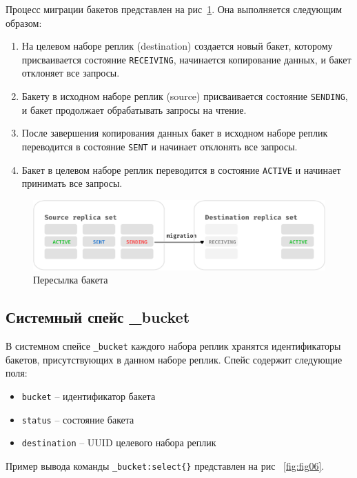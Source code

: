 Процесс миграции бакетов представлен на рис~\ref{fig:fig05}. Она выполняется
следующим образом:

\begin{enumerate}
\item На целевом наборе реплик (destination) создается новый бакет, которому
    присваивается состояние \texttt{RECEIVING}, начинается копирование данных,
        и бакет отклоняет все запросы.
\item Бакету в исходном наборе реплик (source) присваивается состояние
    \texttt{SENDING}, и бакет продолжает обрабатывать запросы на чтение.
\item После завершения копирования данных бакет в исходном наборе реплик
    переводится в состояние \texttt{SENT} и начинает отклонять все запросы.
\item Бакет в целевом наборе реплик переводится в состояние \texttt{ACTIVE} и
    начинает принимать все запросы.
\end{enumerate}

\begin{figure}
  \centering
  \includegraphics[scale=0.7]{inc/states.png}
  \caption{Пересылка бакета \cite{VshardDoc}}
  \label{fig:fig05}
\end{figure}

\subsection{Системный спейс \_bucket}

В системном спейсе \texttt{\_bucket} каждого набора реплик хранятся идентификаторы
бакетов, присутствующих в данном наборе реплик. Спейс содержит следующие поля:

\begin{itemize}
\item \texttt{bucket} -- идентификатор бакета
\item \texttt{status} -- состояние бакета
\item \texttt{destination} -- UUID целевого набора реплик
\end{itemize}

Пример вывода команды \texttt{\_bucket:select\{\}} представлен на рис
~\ref{fig:fig06}.

